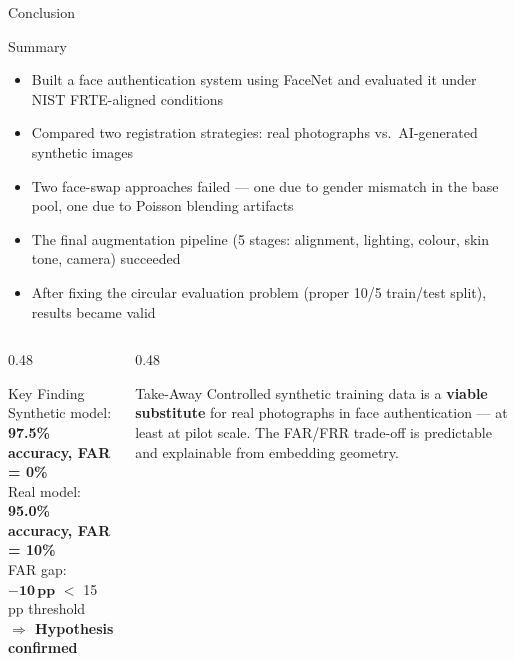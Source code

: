 \documentclass[aspectratio=169]{beamer}
\begin{document}
\begin{frame}{Conclusion}

\begin{block}{Summary}
\begin{itemize}
    \item Built a face authentication system using FaceNet and evaluated it under NIST FRTE-aligned conditions
    \item Compared two registration strategies: real photographs vs.\ AI-generated synthetic images
    \item Two face-swap approaches failed — one due to gender mismatch in the base pool, one due to Poisson blending artifacts
    \item The final augmentation pipeline (5 stages: alignment, lighting, colour, skin tone, camera) succeeded
    \item After fixing the circular evaluation problem (proper 10/5 train/test split), results became valid
\end{itemize}
\end{block}

\vspace{6pt}

\begin{columns}[T]
\begin{column}{0.48\textwidth}
    \begin{exampleblock}{Key Finding}
        Synthetic model: \textbf{97.5\% accuracy, FAR = 0\%}\\
        Real model: \textbf{95.0\% accuracy, FAR = 10\%}\\
        \vspace{4pt}
        FAR gap: $\mathbf{-10\,\text{pp}}$ $<$ 15 pp threshold\\
        \textbf{$\Rightarrow$ Hypothesis confirmed}
    \end{exampleblock}
\end{column}
\begin{column}{0.48\textwidth}
    \begin{alertblock}{Take-Away}
        Controlled synthetic training data is a \textbf{viable substitute} for real photographs in face authentication — at least at pilot scale. The FAR/FRR trade-off is predictable and explainable from embedding geometry.
    \end{alertblock}
\end{column}
\end{columns}

\end{frame}
\end{document}

